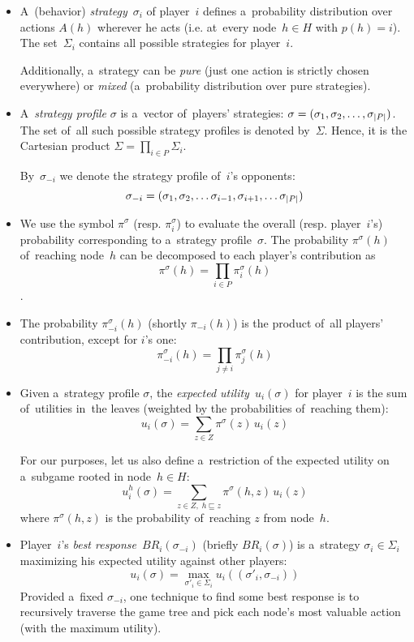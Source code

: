 \begin{itemize}
  \item A~(behavior) \emph{strategy}~$\sigma_i$ of player~$i$ defines a~probability distribution over actions $A(h)$ wherever he acts (i.e. at~every node~$h \in H$ with $p(h) = i$).
    The set~$\Sigma_i$ contains all possible strategies for player~$i$.

  Additionally, a~strategy can be \emph{pure} (just one action is strictly chosen everywhere) or \emph{mixed} (a~probability distribution over pure strategies).

  \item A~\emph{strategy profile} $\sigma$ is a~vector of~players' strategies:
    $\sigma = (\sigma_1, \sigma_2, \ldots, \sigma_ {\left|{P}\right|})$.
    The set of~all such possible strategy profiles is denoted by~$\Sigma$.
    Hence, it is the Cartesian product $\Sigma = \prod_{i \in P} \Sigma_i$.

    By~$\sigma_{-i}$ we denote the strategy profile of~$i$'s opponents:
    \[ \sigma_{-i} = (\sigma_1, \sigma_2, \ldots \sigma_{i-1}, \sigma_{i+1}, \ldots \sigma_ {\left|{P}\right|}) \]

  \item We use the symbol $\pi^\sigma$ (resp. $\pi_i^\sigma$) to evaluate the overall (resp. player~$i$'s) probability corresponding to a~strategy profile~$\sigma$.
    The probability $\pi^\sigma(h)$ of~reaching node~$h$ can be decomposed to each player's contribution as
    \[ \pi ^\sigma(h) = \prod _{i \in P} \pi _i ^\sigma (h) \].

  \item The probability $\pi _{-i} ^\sigma (h)$ (shortly $\pi _{-i} (h)$) is the product of~all players' contribution, except for $i$'s one:
    \[ \pi _{-i} ^\sigma(h) = \prod _{j \ne i} \pi _j ^\sigma (h) \]
    
  \item Given a~strategy profile $\sigma$, the \emph{expected utility}~$u_i (\sigma)$ for player~$i$
    is the sum of~utilities in~the leaves (weighted by the probabilities of~reaching them):
    \[ u_i (\sigma) = \sum _{z \in Z} \pi^\sigma\!(z) \,u_i(z)\]

    For our purposes, let us also define a~restriction of the expected utility on a~subgame rooted in node~$h\in H$:
    \[ u_i^h(\sigma) = \sum _{z \in Z,\; h \sqsubseteq z} \pi^\sigma\!(h,z) \,u_i(z) \]
    where $\pi^\sigma(h,z)$ is the probability of~reaching $z$ from node~$h$.

  \item Player~$i$'s \emph{best response}~$BR _i (\sigma _{-i})$ (briefly $BR _i (\sigma)$) is a~strategy $\sigma _i \in \Sigma _i$ maximizing his expected utility against other players:
    \[ u_i (\sigma) = \max _{\sigma'_i \in \Sigma_i} u_i ((\sigma'_i, \sigma_{-i})) \]
    Provided a~fixed $\sigma_{-i}$, one technique to find some best response is to recursively traverse the game tree and pick each node's most valuable action (with the maximum utility).
\end{itemize}
